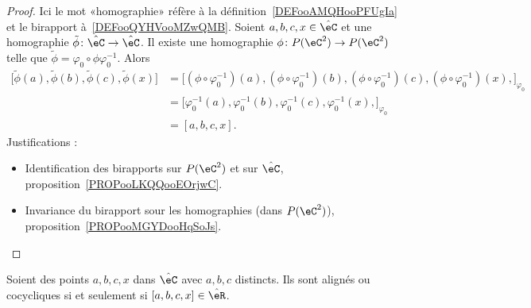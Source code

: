 \begin{proof}
	Ici le mot «homographie» réfère à la définition~\ref{DEFooAMQHooPFUgIa} et le birapport à~\ref{DEFooQYHVooMZwQMB}. Soient \( a,b,c,x\in\hat\eC\) et une homographie \( \tilde \phi\colon \hat \eC\to \hat \eC\). Il existe une homographie \( \phi\colon P(\eC^2)\to P(\eC^2)\) telle que \( \tilde \phi=\varphi_0\circ\phi\varphi_0^{-1}\). Alors
	\begin{subequations}
		\begin{align}
			\big[ \tilde \phi(a), \tilde \phi(b),\tilde \phi(c),\tilde \phi(x) \big] & =\big[  (\phi\circ\varphi_0^{-1})(a), (\phi\circ\varphi_0^{-1})(b),(\phi\circ\varphi_0^{-1})(c),  (\phi\circ\varphi_0^{-1})(x),  \big]_{\varphi_0} \\
			                                                                         & =\big[  \varphi_0^{-1}(a), \varphi_0^{-1}(b),\varphi_0^{-1}(c), \varphi_0^{-1}(x),  \big]_{\varphi_0}                                              \\
			                                                                         & =[a,b,c,x].
		\end{align}
	\end{subequations}
	Justifications :
	\begin{itemize}
		\item Identification des birapports sur \( P(\eC^2)\) et sur \( \hat \eC\), proposition~\ref{PROPooLKQQooEOrjwC}.
		\item Invariance du birapport sour les homographies (dans \( P(\eC^2)\)), proposition~\ref{PROPooMGYDooHqSoJs}.
	\end{itemize}
\end{proof}

\begin{proposition}     \label{PROPooSGCJooLnOLCx}
	Soient des points \( a,b,c,x\) dans \( \hat\eC\) avec \( a,b,c\) distincts. Ils sont alignés ou cocycliques si et seulement si \( [a,b,c,x]\in \hat\eR\).
\end{proposition}

